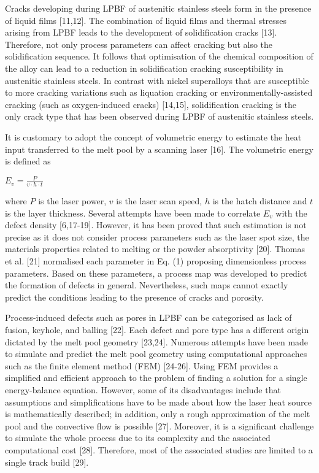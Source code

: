 \documentclass[10pt]{article}
\begin{document}
Cracks developing during LPBF of austenitic stainless steels form in the presence of liquid films [11,12]. The combination of liquid films and thermal stresses arising from LPBF leads to the development of solidification cracks [13]. Therefore, not only process parameters can affect cracking but also the solidification sequence. It follows that optimisation of the chemical composition of the alloy can lead to a reduction in solidification cracking susceptibility in austenitic stainless steels. In contrast with nickel superalloys that are susceptible to more cracking variations such as liquation cracking or environmentally-assisted cracking (such as oxygen-induced cracks) [14,15], solidification cracking is the only crack type that has been observed during LPBF of austenitic stainless steels.

It is customary to adopt the concept of volumetric energy to estimate the heat input transferred to the melt pool by a scanning laser [16]. The volumetric energy is defined as

$E_{v}=\frac{P}{v \cdot h \cdot t}$

where $P$ is the laser power, $v$ is the laser scan speed, $h$ is the hatch distance and $t$ is the layer thickness. Several attempts have been made to correlate $E_{v}$ with the defect density [6,17-19]. However, it has been proved that such estimation is not precise as it does not consider process parameters such as the laser spot size, the materials properties related to melting or the powder absorptivity [20]. Thomas et al. [21] normalised each parameter in Eq. (1) proposing dimensionless process parameters. Based on these parameters, a process map was developed to predict the formation of defects in general. Nevertheless, such maps cannot exactly predict the conditions leading to the presence of cracks and porosity.

Process-induced defects such as pores in LPBF can be categorised as lack of fusion, keyhole, and balling [22]. Each defect and pore type has a different origin dictated by the melt pool geometry [23,24]. Numerous attempts have been made to simulate and predict the melt pool geometry using computational approaches such as the finite element method (FEM) [24-26]. Using FEM provides a simplified and efficient approach to the problem of finding a solution for a single energy-balance equation. However, some of its disadvantages include that assumptions and simplifications have to be made about how the laser heat source is mathematically described; in addition, only a rough approximation of the melt pool and the convective flow is possible [27]. Moreover, it is a significant challenge to simulate the whole process due to its complexity and the associated computational cost [28]. Therefore, most of the associated studies are limited to a single track build [29].
\end{document}
